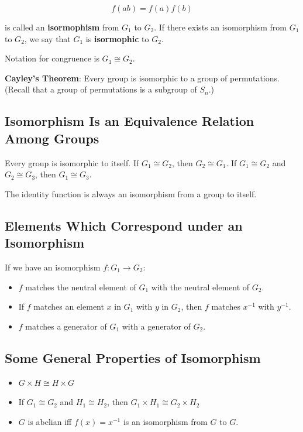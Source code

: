\documentclass[11pt]{article}
\begin{document}
\[f(ab) = f(a)f(b)\]

is called an \textbf{isormophism} from \(G_1\) to \(G_2\). If there
exists an isomorphism from \(G_1\) to \(G_2\), we say that \(G_1\) is
\textbf{isormophic} to \(G_2\).

Notation for congruence is \(G_1 \cong G_2\).

\textbf{Cayley's Theorem}: Every group is isomorphic to a group of
permutations. (Recall that a group of permutations is a subgroup of
\(S_n\).)

\subsection{Isomorphism Is an Equivalence Relation Among
Groups}\label{isomorphism-is-an-equivalence-relation-among-groups}

Every group is isomorphic to itself. If \(G_1 \cong G_2\), then
\(G_2 \cong G_1\). If \(G_1 \cong G_2\) and \(G_2 \cong G_3\), then
\(G_1 \cong G_3\).

The identity function is always an isomorphism from a group to itself.

\subsection{Elements Which Correspond under an
Isomorphism}\label{elements-which-correspond-under-an-isomorphism}

If we have an isomorphism \(f: G_1 \rightarrow G_2\):

\begin{itemize}
\tightlist
\item
  \(f\) matches the neutral element of \(G_1\) with the neutral element
  of \(G_2\).
\item
  If \(f\) matches an element \(x\) in \(G_1\) with \(y\) in \(G_2\),
  then \(f\) matches \(x^{-1}\) with \(y^{-1}\).
\item
  \(f\) matches a generator of \(G_1\) with a generator of \(G_2\).
\end{itemize}

\subsection{Some General Properties of
Isomorphism}\label{some-general-properties-of-isomorphism}

\begin{itemize}
\tightlist
\item
  \(G \times H \cong H \times G\)
\item
  If \(G_1 \cong G_2\) and \(H_1 \cong H_2\), then
  \(G_1 \times H_1 \cong G_2 \times H_2\)
\item
  \(G\) is abelian iff \(f(x) = x^{-1}\) is an isomorphism from \(G\) to
  \(G\).
\end{itemize}
\end{document}
